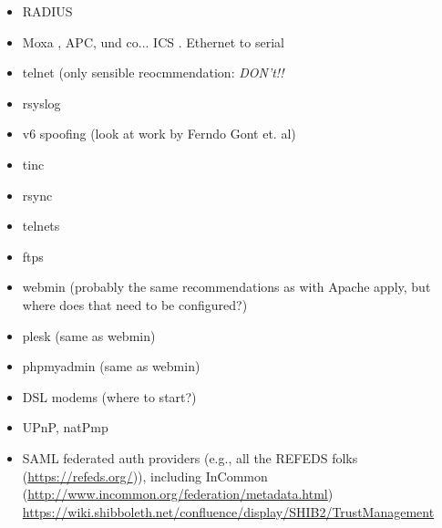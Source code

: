 \begin{minipage}[b]{0.5\linewidth}
\begin{itemize}
\item RADIUS 
\item Moxa , APC, und co... ICS . Ethernet to serial 
\item telnet (only sensible reocmmendation: \emph{DON't!!}
\item rsyslog 
\item v6 spoofing (look at work by Ferndo Gont et. al)
\item tinc
\item rsync 
\item telnets 
\item ftps 
\item webmin (probably the same recommendations as with Apache apply, but where does that need to be configured?)
\item plesk (same as webmin)
\item phpmyadmin (same as webmin)
\item DSL modems (where to start?)
\item UPnP, natPmp 
\item SAML federated auth providers (e.g., all the REFEDS folks (\url{https://refeds.org/})), including InCommon (\url{http://www.incommon.org/federation/metadata.html})
  \url{https://wiki.shibboleth.net/confluence/display/SHIB2/TrustManagement} 
\end{itemize}
\end{minipage}





